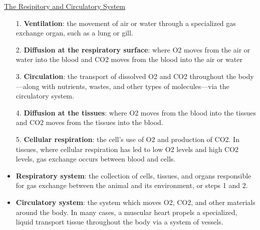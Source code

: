 \documentclass[12pt,letterpaper]{article}
\begin{document}
\hypertarget{42.1}{}
\begin{secbox}{\hyperlink{42}{The Resipitory and Circulatory System}}{
    \begin{itemize}
        \item [1.]\textbf{Ventilation}: the movement of air or water through a specialized gas exchange organ, such as a lung or gill.
        \item [2.]\textbf{Diffusion at the respiratory surface}: where O2 moves from the air or water into the blood and CO2 moves from the blood into the air or water
        \item [3.]\textbf{Circulation}: the transport of dissolved O2 and CO2 throughout the body—along with nutrients, wastes, and other types of molecules—via the circulatory system.
        \item [4.]\textbf{Diffusion at the tissues}: where O2 moves from the blood into the tissues and CO2 moves from the tissues into the blood.
        \item [5.]\textbf{Cellular respiration}: the cell’s use of O2 and production of CO2. In tissues, where cellular respiration has led to low O2 levels and high CO2 levels, gas exchange occurs between blood and cells.
        \item \textbf{Respiratory system}: the collection of cells, tissues, and organs responsible for gas exchange between the animal and its environment, or steps 1 and 2.
        \item \textbf{Circulatory system}: the system which moves O2, CO2, and other materials around the body. In many cases, a muscular heart propels a specialized, liquid transport tissue throughout the body via a system of vessels. 
    \end{itemize}
}\end{secbox}
\end{document}
